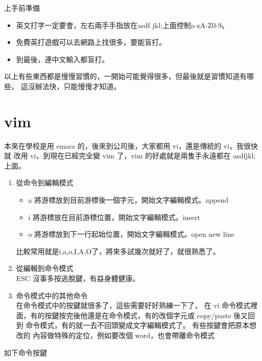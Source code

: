   上手前準備
  \begin{itemize}
    \item 英文打字一定要會，左右兩手手指放在asdf  jkl;上面控制a-zA-Z0-9。
    \item 免費英打遊戲可以去網路上找很多，要能盲打。
    \item 到最後，連中文輸入都盲打。
  \end{itemize}
  以上有些東西都是慢慢習慣的，一開始可能覺得很多，但最後就是習慣知道有哪些，
  這沒辦法快，只能慢慢才知道。

  \section{vim}
    本來在學校是用 emacs 的，後來到公司後，大家都用 vi，還是傳統的 vi，我很快就
    改用 vi，到現在已經完全變 vim 了，vim 的好處就是兩隻手永遠都在 asdfjkl;
    上面。
    \begin{enumerate}
      \item 從命令到編輯模式
        \begin{itemize}
          \item a 將游標放到目前游標後一個字元，開始文字編輯模式。append
          \item i 將游標放在目前游標位置，開始文字編輯模式。insert
          \item o 將游標放到下一行起始位置，開始文字編輯模式。open new line
        \end{itemize}
      比較常用就是i,a,o,I,A,O了，將來多試幾次就好了，就很熟悉了。
      \item 從編輯到命令模式\\
        ESC 沒事多按逃脫鍵，有益身體健康。
      \item 命令模式中的其他命令\\
        在命令模式中的按鍵就很多了，這些需要好好熟練一下了， 在 vi 命令模式裡
        面，有的按鍵按完後他還是在命令模式，有的改個字元或 copy/paste 後又回到
        命令模式，有的就一去不回頭變成文字編輯模式了。 有些按鍵會把原本想改的
        內容做特殊的定位，例如要改個 word，也會帶離命令模式
    \end{enumerate}
    如下命令按鍵
